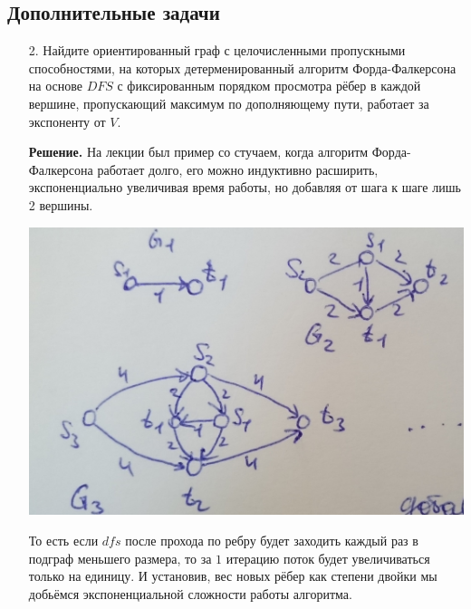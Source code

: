 \subsection*{Дополнительные задачи}
\begin{enumerate}
	\item[2.] Найдите ориентированный граф с целочисленными пропускными способностями, на которых детерменированный 
	алгоритм Форда-Фалкерсона на основе $DFS$ с фиксированным порядком просмотра рёбер в каждой вершине, 
	пропускающий максимум по дополняющему пути, работает за экспоненту от $V$.
	
	\textbf{Решение.} На лекции был пример со стучаем, когда алгоритм Форда-Фалкерсона работает долго, его можно 
	индуктивно расширить, экспоненциально увеличивая время работы, но добавляя от шага к шаге лишь 2 вершины.
	\begin{center}
		\includegraphics[scale=0.1]{ha/img/1.JPG}
	\end{center}
	То есть если $dfs$ после прохода по ребру будет заходить каждый раз в подграф меньшего размера, то за $1$ 
	итерацию поток будет увеличиваться только на единицу. И установив, вес новых рёбер как степени двойки мы 
	добьёмся экспоненциальной сложности работы алгоритма.
\end{enumerate}